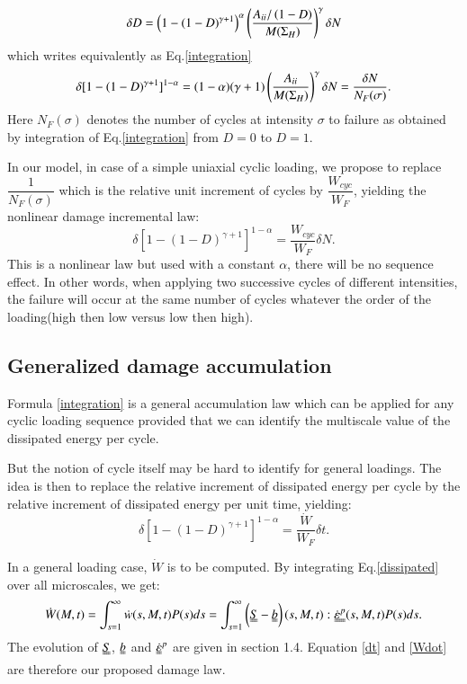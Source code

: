 \documentclass[3p,times,number,review]{elsarticle}
\begin{document}
 \begin{equation}\delta D = \left( 1 -(1-D)^{\gamma+1}\right)^\alpha \left(\frac{{A}_{\uppercase\expandafter{\romannumeral2}}/\left( 1-D\right) }{M(\Sigma_H)}\right)^\gamma \delta N
 \label{chabochemulti}
 \end{equation} 
 which writes equivalently as Eq.\eqref{integration}
   \begin{equation}\delta [1-(1-D)^{\gamma+1}]^{1-\alpha}=(1-\alpha)(\gamma+1)\left(\dfrac{{A}_{\uppercase\expandafter{\romannumeral2}} }{M(\Sigma_H)}\right)^\gamma \delta N=\dfrac{\delta N}{N_F(\sigma)}.
   \label{integration}
   \end{equation}
Here $N_F(\sigma)$ denotes the number of cycles at intensity $\sigma$ to failure as obtained by integration of Eq.\eqref{integration} from $D=0$ to $D=1$.

In our model, in case of a simple uniaxial cyclic loading, we propose to replace $\dfrac{1}{N_F(\sigma)}$ which is the relative unit increment of cycles by $\dfrac{W_{cyc}}{W_F}$, yielding the nonlinear damage incremental law:
	\begin{equation}
	\delta[1-(1-D)^{\gamma+1}]^{1-\alpha}=\dfrac{W_{cyc}}{W_F}\delta N.
\label{integrationW}
\end{equation}
This is a nonlinear law but used with a constant $\alpha$, there will be no sequence effect. In other words,
 when applying two successive cycles of different intensities, the failure will occur at the same number of cycles whatever the order of the loading(high then low versus low then high).
 
\subsection{Generalized damage accumulation}
Formula \eqref{integration} is a general accumulation law which can be applied for any cyclic loading sequence provided that we can identify the multiscale value of the dissipated energy per cycle. 

But the notion of cycle itself may be hard to identify for general loadings. The idea is then to replace the relative increment of dissipated energy per cycle by the relative increment of dissipated energy per unit time, yielding:
\begin{equation}
\delta [1-(1-D)^{\gamma+1}]^{1-\alpha}=\dfrac{\dot{W}}{W_F}\delta t.
\label{dt}
\end{equation}

In a general loading case, $\dot{W}$ is to be computed. By integrating Eq.\eqref{dissipated} over all microscales, we get:
\begin{equation}\dot{W}(M,t)=\int_{s=1}^{\infty}\dot{w}(s,M,t)P(s)ds=\int_{s=1}^{\infty}\left(\uuline{S}-\uuline{b} \right) (s,M,t):\uuline{\dot{\varepsilon}^p}(s,M,t)P(s)ds.\label{Wdot}
\end{equation}
The evolution of $\uuline{S}$, $\uuline{b}$ and $\uuline{\dot{\varepsilon}}^p$ are given in section 1.4. Equation \eqref{dt} and \eqref{Wdot} are therefore our proposed damage law.
\end{document}
